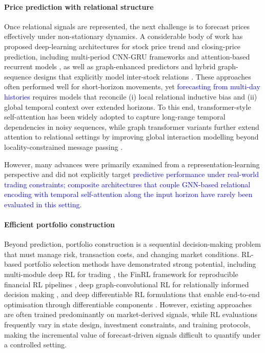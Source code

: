 \documentclass[pdflatex,sn-mathphys-num]{sn-jnl}%
\theoremstyle{thmstyleone}%
\theoremstyle{thmstyletwo}%
\theoremstyle{thmstylethree}%
\begin{document}
\paragraph{Price prediction with relational structure}
Once relational signals are represented, the next challenge is to forecast prices effectively under non-stationary dynamics. 
A considerable body of work has proposed deep-learning architectures for stock price trend and closing-price prediction, including multi-period CNN-GRU frameworks and attention-based recurrent models
\citep{Luo2023MethanolFutures,Lee2022GRUAttentionTrading,Zhang2022TSLALSTMGRU},
as well as graph-enhanced predictors and hybrid graph-sequence designs that explicitly model inter-stock relations
\citep{Ye2020MultiGraph,Yun2019GraphTransformerNetworks,Li2022FDGRUTransformer,Lu2025BiLSTMGAT}.
These approaches often performed well for short-horizon movements, yet \textcolor{blue}{forecasting from multi-day histories} requires models that reconcile (i) local relational inductive bias and (ii) global temporal context over extended horizons. 
To this end, transformer-style self-attention has been widely adopted to capture long-range temporal dependencies in noisy sequences, while graph transformer variants further extend attention to relational settings by improving global interaction modelling beyond locality-constrained message passing
\citep{Shehzad2024GraphTransformersSurvey,Gao2024DiffsFormer,Wu2023NodeFormer,Shirzad2023Exphormer,Chen2022StructureAwareTransformerGraphs}.

However, many advances were primarily examined from a representation-learning perspective and did not explicitly target \textcolor{blue}{predictive performance under real-world trading constraints; composite architectures that couple GNN-based relational encoding with temporal self-attention along the input horizon have rarely been evaluated in this setting}.

\paragraph{Efficient portfolio construction}
Beyond prediction, portfolio construction is a sequential decision-making problem that must manage risk, transaction costs, and changing market conditions. 
RL-based portfolio selection methods have demonstrated strong potential, including multi-module deep RL for trading \citep{Ma2021ParallelMultiModuleDRLTrading}, the FinRL framework for reproducible financial RL pipelines \citep{Liu2021FinRL}, deep graph-convolutional RL for relationally informed decision making \citep{Farzan2021DeepPocket}, and deep differentiable RL formulations that enable end-to-end optimisation through differentiable components \citep{Thibault2022DeepDifferentiableRLTrading}.
However, existing approaches are often trained predominantly on market-derived signals, while RL evaluations frequently vary in state design, investment constraints, and training protocols, making the incremental value of forecast-driven signals difficult to quantify under a controlled setting. 
\end{document}
